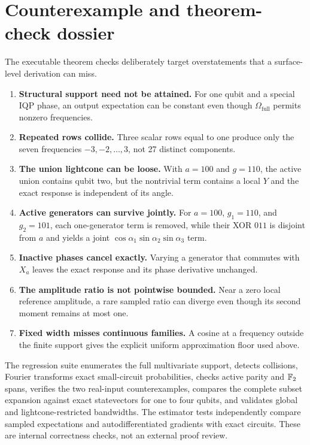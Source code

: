\section{Counterexample and theorem-check dossier}
\label{app:checks}

The executable theorem checks deliberately target overstatements that a
surface-level derivation can miss.

\begin{enumerate}
\item \textbf{Structural support need not be attained.} For one qubit and a
special IQP phase, an output expectation can be constant even though
$\Omega_{\mathrm{full}}$ permits nonzero frequencies.
\item \textbf{Repeated rows collide.} Three scalar rows equal to one produce
only the seven frequencies $-3,-2,\ldots,3$, not 27 distinct components.
\item \textbf{The union lightcone can be loose.} With $a=100$ and $g=110$,
the active union contains qubit two, but the nontrivial term contains a local
$Y$ and the exact response is independent of its angle.
\item \textbf{Active generators can survive jointly.} For $a=100$,
$g_1=110$, and $g_2=101$, each one-generator term is removed, while their XOR
$011$ is disjoint from $a$ and yields a joint
$\cos\alpha_1\sin\alpha_2\sin\alpha_3$ term.
\item \textbf{Inactive phases cancel exactly.} Varying a generator that
commutes with $X_a$ leaves the exact response and its phase derivative
unchanged.
\item \textbf{The amplitude ratio is not pointwise bounded.} Near a zero local
reference amplitude, a rare sampled ratio can diverge even though its second
moment remains at most one.
\item \textbf{Fixed width misses continuous families.} A cosine at a frequency
outside the finite support gives the explicit uniform approximation floor used
above.
\end{enumerate}

The regression suite enumerates the full multivariate support, detects
collisions, Fourier transforms exact small-circuit probabilities, checks
active parity and $\mathbb{F}_2$ spans, verifies the two real-input counterexamples,
compares the complete subset expansion against exact statevectors for one to
four qubits, and validates global and lightcone-restricted bandwidths.  The
estimator tests independently compare sampled expectations and
autodifferentiated gradients with exact circuits.  These are internal
correctness checks, not an external proof review.

